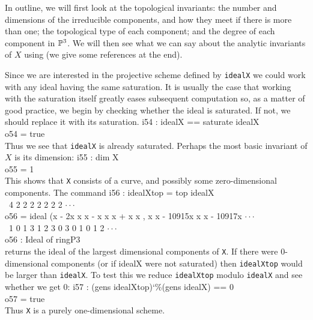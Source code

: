 In outline, we will first look at the topological invariants:
the number and dimensions of the irreducible components,
and how they meet if there is more than one; the topological
type of each component; and the degree of each component in
$\P^3$. We will then see what we can say about the analytic
invariants of $X$ using  (we give some references
at the end).

Since we are interested in the projective scheme defined by 
{\tt idealX} we could work with any ideal having the same
saturation. It is usually the case that working with the
saturation itself greatly eases subsequent computation so,
as a matter of good practice, 
we begin by checking whether the ideal is saturated. If
not, we should replace it with its saturation.
\beginOutput
i54 : idealX == saturate idealX\\
\emptyLine
o54 = true\\
\endOutput
Thus we see that {\tt idealX} is already saturated.
Perhaps the most basic invariant of $X$ is its dimension:
\beginOutput
i55 : dim X\\
\emptyLine
o55 = 1\\
\endOutput
This shows that {\tt X} consists of a curve, and
possibly some zero-dimensional components.
The command
\beginOutput
i56 : idealXtop = top idealX\\
\emptyLine
\              4       2      2        2 2   2 2           2            $\cdot\cdot\cdot$\\
o56 = ideal (x  - 2x x x  - x x x  + x x , x x  - 10915x x x  - 10917x $\cdot\cdot\cdot$\\
\              1     0 1 3    1 2 3    0 3   0 1         0 1 2          $\cdot\cdot\cdot$\\
\emptyLine
o56 : Ideal of ringP3\\
\endOutput
{}%
returns the ideal of the largest dimensional components of {\tt X}.
If there were 0-dimensional components (or if idealX were not saturated)
then {\tt idealXtop} would be larger than {\tt idealX}.
To test this we reduce {\tt idealXtop} modulo {\tt idealX}
and see whether we get 0:
\beginOutput
i57 : (gens idealXtop){\char`\%}(gens idealX) == 0\\
\emptyLine
o57 = true\\
\endOutput
Thus
{\tt X}
is a purely one-dimensional scheme.


